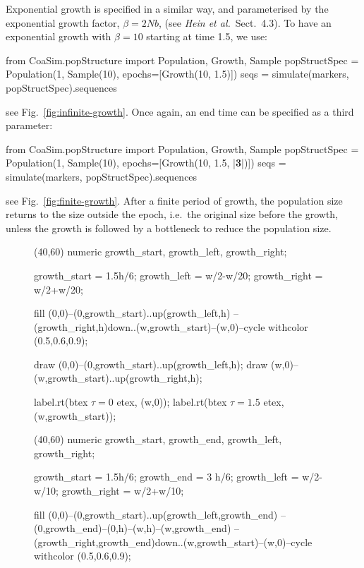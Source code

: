 \documentclass{manual}
\begin{document}
\begin{empfile}
Exponential growth is specified in a similar way, and parameterised by
the exponential growth factor, $\beta=2Nb$, (see \emph{Hein
  et al.}\ Sect.~4.3).  To have an exponential growth with $\beta=10$
starting at time 1.5, we use:
\begin{code}
from CoaSim.popStructure import Population, Growth, Sample
popStructSpec = Population(1, Sample(10), 
                           epochs=[Growth(10, 1.5)])
seqs = simulate(markers, popStructSpec).sequences
\end{code}
see Fig.~\ref{fig:infinite-growth}.  Once again, an end time can be
specified as a third parameter:
\begin{code}
from CoaSim.popStructure import Population, Growth, Sample
popStructSpec = Population(1, Sample(10), 
                           epochs=[Growth(10, 1.5, |\textbf{3}|)])
seqs = simulate(markers, popStructSpec).sequences
\end{code}
see Fig.~\ref{fig:finite-growth}.  After a finite period of growth,
the population size returns to the size outside the epoch, i.e.\ the
original size before the growth, unless the growth is followed by a
bottleneck to reduce the population size.

\begin{figure}[t]
  \begin{empdef}(40,60)
    numeric growth_start, growth_left, growth_right;
  
    growth_start = 1.5h/6;
    growth_left  = w/2-w/20;
    growth_right = w/2+w/20;

    fill (0,0)--(0,growth_start)..{up}(growth_left,h)
         --(growth_right,h){down}..(w,growth_start)--(w,0)--cycle
         withcolor (0.5,0.6,0.9); %
  
    draw (0,0)--(0,growth_start)..{up}(growth_left,h);
    draw (w,0)--(w,growth_start)..{up}(growth_right,h);
  
    label.rt(btex $\tau=0$ etex,   (w,0));
    label.rt(btex $\tau=1.5$ etex, (w,growth_start));
  \end{empdef}
  \begin{empdef}(40,60)
    numeric growth_start, growth_end, growth_left, growth_right;

    growth_start = 1.5h/6;
    growth_end   = 3  h/6;
    growth_left  = w/2-w/10;
    growth_right = w/2+w/10;

    fill (0,0)--(0,growth_start)..{up}(growth_left,growth_end)
         --(0,growth_end)--(0,h)--(w,h)--(w,growth_end)
         --(growth_right,growth_end){down}..(w,growth_start)--(w,0)--cycle
         withcolor (0.5,0.6,0.9); %
  

\end{empdef}
\end{figure}
\end{empfile}
\end{document}
